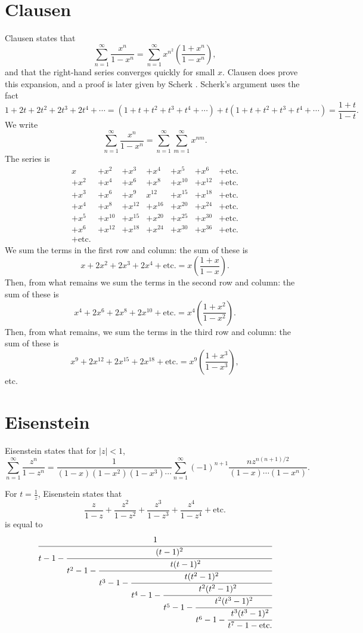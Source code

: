 \documentclass{amsart}
\begin{document}
\section{Clausen}
Clausen \cite{clausen} states that
\[
\sum_{n=1}^\infty \frac{x^n}{1-x^n} = \sum_{n=1}^\infty x^{n^2} \left(\frac{1+x^n}{1-x^n}\right),
\]
and that the right-hand series converges quickly for small $x$. Clausen does prove this expansion, and a proof
is later given by Scherk \cite{scherk}. Scherk's argument uses the fact
\[
1+2t+2t^2+2t^3+2t^4+\cdots = 
(1+t+t^2+t^3+t^4+\cdots) + t(1+t+t^2+t^3+t^4+\cdots)=
\frac{1+t}{1-t}.
\]
We write
\[
\sum_{n=1}^\infty \frac{x^n}{1-x^n} = \sum_{n=1}^\infty \sum_{m=1}^\infty x^{nm}.
\]
The series is
\[
\begin{array}{rrrrrrr}
x&+x^2&+x^3&+x^4&+x^5&+x^6&+\mathrm{etc.}\\
+x^2&+x^4&+x^6&+x^8&+x^{10}&+x^{12}&+\mathrm{etc.}\\
+x^3&+x^6&+x^9&x^{12}&+x^{15}&+x^{18}&+\mathrm{etc.}\\
+x^4&+x^8&+x^{12}&+x^{16}&+x^{20}&+x^{24}&+\mathrm{etc.}\\
+x^5&+x^{10}&+x^{15}&+x^{20}&+x^{25}&+x^{30}&+\mathrm{etc.}\\
+x^6&+x^{12}&+x^{18}&+x^{24}&+x^{30}&+x^{36}&+\mathrm{etc.}\\
+\mathrm{etc.}&&&&&&
\end{array}
\]
We sum the terms in the first row and column: the sum of these is
\[
x+2x^2+2x^3+2x^4+\mathrm{etc.} = x\left( \frac{1+x}{1-x}\right).
\]
Then, from what remains we sum the terms in the second row and column: the sum of these is
\[
x^4+2x^6+2x^8+2x^{10}+\mathrm{etc.} = x^4\left( \frac{1+x^2}{1-x^2}\right).
\]
 Then,
from what remains, we sum the terms in the third row and column: the sum of these is
\[
x^9+2x^{12}+2x^{15}+2x^{18}+\mathrm{etc.} = x^9\left(\frac{1+x^3}{1-x^3}\right),
\]
etc.


\section{Eisenstein}
Eisenstein \cite{eisenstein1844} states that
for $|z|<1$,
\[
\sum_{n=1}^\infty \frac{z^n}{1-z^n} =\frac{1}{(1-x)(1-x^2)(1-x^3)\cdots} \sum_{n=1}^\infty 
(-1)^{n+1} \frac{nz^{n(n+1)/2}}{(1-x)\cdots(1-x^n)}.
\]

For $t=\frac{1}{z}$,
Eisenstein states that
\[
\frac{z}{1-z}+\frac{z^2}{1-z^2}+\frac{z^3}{1-z^3}+\frac{z^4}{1-z^4}+\textrm{etc.}
\]
is equal to
\[
\cfrac{1}{t-1-\cfrac{(t-1)^2}{t^2-1-\cfrac{t(t-1)^2}{t^3-1-\cfrac{t(t^2-1)^2}{t^4-1-\cfrac{t^2(t^2-1)^2}{t^5-1-
\cfrac{t^2(t^3-1)^2}{t^6-1-\cfrac{t^3(t^3-1)^2}{t^7-1-\textrm{etc.}}}}}}}}
\]
\end{document}
